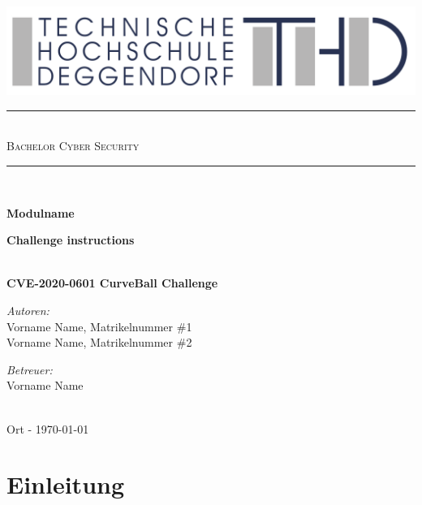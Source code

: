 \documentclass{article}
\begin{document}

\begin{titlepage}
	\begin{center}
		
        \includegraphics[width=\textwidth]{THD-Logo.pdf}
	
	    \vspace{1cm}
	
		\rule{1\textwidth}{1mm} \\[0.3cm]

		\textsc{\scshape \huge Bachelor Cyber Security}\\
		
		\rule{1\textwidth}{1mm} \\[2cm] 
		
		{ 
			 \vspace{1cm}
			 
			 \Large \textbf{Modulname}
			 
			 \vspace{3cm}
			 \Large \textbf{Challenge instructions}}\\[0.5cm]
			 \LARGE \textbf{CVE-2020-0601 CurveBall Challenge}\\[2cm]
		\begin{minipage}[t]{0.4\textwidth}
			\begin{flushleft} \normalsize
				\emph{Autoren:}\\[0.3cm]
				
			    Vorname Name, Matrikelnummer \#1\\
			    Vorname Name, Matrikelnummer \#2\\
				
			\end{flushleft}
		\end{minipage}
		\begin{minipage}[t]{0.5\textwidth}
			\begin{flushright} \normalsize
				\emph{Betreuer:}\\[0.3cm]
				
    			Vorname Name 
				
			\end{flushright}
		\end{minipage}\\[3cm]
		{\large Ort - \today\\}	
		\vspace{3cm}
	\end{center}
\end{titlepage}


\section{Einleitung}
\end{document}
